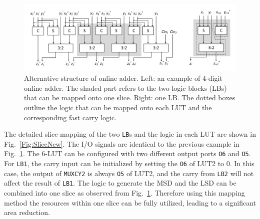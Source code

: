 \documentclass[conference]{IEEEtran}
\begin{document}

\begin{figure}[tbp]
	\centering
	\includegraphics[width=.85\textwidth]{./Figures/SDadder_FPGA_New_4digit2.pdf}
	\vspace{-3ex}
	\caption{Alternative structure of online adder. Left: an example of 4-digit online adder. The shaded part refers to the two logic blocks (LBs) that can be mapped onto one slice. Right: one LB. The dotted boxes outline the logic that can be mapped onto each LUT and the corresponding fast carry logic.}
	\vspace{-2ex}	
	\label{Fig:ModifiedOA}
\end{figure}

The detailed slice mapping of the two \texttt{LB}s and the logic in each LUT are shown in Fig.~\ref{Fig:SliceNew}. The I/O signals are identical to the previous example in Fig.~\ref{Fig:ModifiedOA}. The 6-LUT can be configured with two different output ports \texttt{O6} and \texttt{O5}. For \texttt{LB1}, the carry input can be initialized by setting the \texttt{O6} of LUT2 to 0. In this case, the output of \texttt{MUXCY2} is always \texttt{O5} of LUT2, and the carry from \texttt{LB2} will not affect the result of \texttt{LB1}. The logic to generate the MSD and the LSD can be combined into one slice as observed from Fig.~\ref{Fig:ModifiedOA}. Therefore using this mapping method the resources within one slice can be fully utilized, leading to a significant area reduction.\vspace{-0.5ex}
\end{document}
